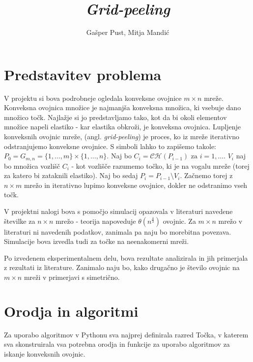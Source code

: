 \documentclass[a4paper]{article}
\title{\textit{Grid-peeling}}
\author{Gašper Pust, Mitja Mandić}
\begin{document}
\begin{titlepage}
 \maketitle
\end{titlepage}

\section{Predstavitev problema}
V projektu si bova podrobneje ogledala konveksne ovojnice $m \times n$ mreže. Konveksna ovojnica množice je najmanjša konveksna množica, ki vsebuje dano množico točk.
Najlažje si jo predstavljamo tako, kot da bi okoli elementov množice napeli elastiko - kar elastika obkroži, je konveksna ovojnica. Lupljenje konveksnih ovojnic mreže,
(angl. \textit{grid-peeling}) je proces, ko iz mreže iterativno odstranjujemo konveksne ovojnice. S simboli lahko to zapišemo takole:
$ P_{0} = G_{m,n} = \{1,\ldots, m\} \times \{1, \ldots, n\}$. Naj bo $C_{i} = \mathcal{C}\mathcal{H}(P_{i-1}) \text{ za } i = 1, \ldots$. $V_{i}$ naj bo množica vozlišč $C_{i}$
- kot vozlišče razumemo točko, ki je na vogalu mreže (torej za katero bi zataknili elastiko). Naj bo sedaj $P_{i} = P_{i-1} \setminus V_{i}$. Začnemo torej z $n \times m$ mrežo 
in iterativno lupimo konveksne ovojnice, dokler ne odstranimo vseh točk.

V projektni nalogi bova s pomočjo simulacij opazovala v literaturi navedene številke za $n \times n$ mrežo - teorija napoveduje $\theta(n ^ \frac{4}{3})$ ovojnic.
Za $m \times n$ mrežo v literaturi ni navedenih podatkov, zanimala pa naju bo morebitna povezava. Simulacije bova izvedla tudi za točke na neenakomerni mreži.

Po izvedenem eksperimentalnem delu, bova rezultate analizirala in jih primerjala z rezultati iz literature. Zanimalo naju bo, kako drugačno je število ovojnic na $m \times n$
mreži v primerjavi s simetrično.

\newpage
\section{Orodja in algoritmi}
Za uporabo algoritmov v Pythonu sva najprej definirala razred Točka, v katerem sva skonstruirala vsa potrebna orodja in funkcije za uporabo algoritmov za iskanje konveksnih ovojnic.
\end{document}
